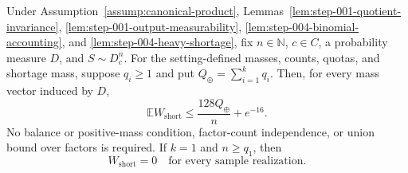 \begin{proposition}
\label{prop:step-004-weighted-shortage}
Under Assumption~\ref{assump:canonical-product},
Lemmas~\ref{lem:step-001-quotient-invariance},
\ref{lem:step-001-output-measurability},
\ref{lem:step-004-binomial-accounting}, and
\ref{lem:step-004-heavy-shortage}, fix \(n\in\mathbb N\), \(c\in C\),
a probability measure \(D\), and \(S\sim D_c^n\).  For the setting-defined
masses, counts, quotas, and shortage mass, suppose \(q_i\ge1\) and put
\(Q_\oplus=\sum_{i=1}^kq_i\).  Then, for every mass vector induced by
\(D\),
\begin{equation}\label{eq:step-004-weighted-shortage}
\mathbb E W_{\mathrm{short}}
\le\frac{128Q_\oplus}{n}+e^{-16}.
\end{equation}
No balance or positive-mass condition, factor-count independence, or
union bound over factors is required.  If \(k=1\) and \(n\ge q_1\), then
\begin{equation}\label{eq:step-004-one-factor-shortage}
W_{\mathrm{short}}=0
\quad\text{for every sample realization}.
\end{equation}
\end{proposition}

